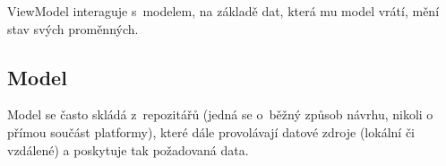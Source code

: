 \documentclass[twoside]{ctuthesis}
\begin{document}
\begin{enumerate}[label=\textbf{O\arabic*.}]
ViewModel interaguje s~modelem, na základě dat, která mu model vrátí, mění stav svých proměnných.

\subsection{Model}

Model se často skládá z~repozitářů (jedná se o~běžný způsob návrhu, nikoli o přímou součást platformy), které dále provolávají datové zdroje (lokální či vzdálené) a poskytuje tak požadovaná data.

\newpage


%
%


\end{enumerate}
\end{document}
